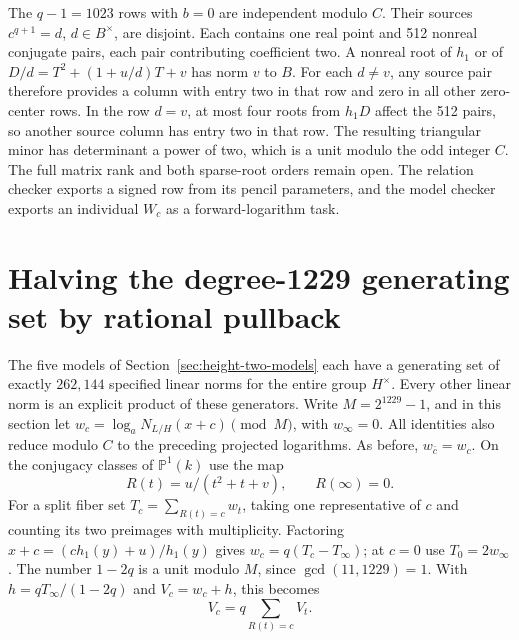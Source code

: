 \documentclass[11pt]{article}
\begin{document}
The \(q-1=1023\) rows with \(b=0\) are independent modulo \(C\).
Their sources \(c^{q+1}=d\), \(d\in B^\times\), are disjoint.
Each contains one real point and 512 nonreal conjugate pairs,
each pair contributing coefficient two. A nonreal root of \(h_1\)
or of \(D/d=T^2+(1+u/d)T+v\) has norm \(v\) to \(B\).
For each \(d\ne v\), any source pair therefore provides a column
with entry two in that row and zero in all other zero-center rows.
In the row \(d=v\), at most four roots from \(h_1D\) affect the
512 pairs, so another source column has entry two in that row.
The resulting triangular minor has determinant a power of two,
which is a unit modulo the odd integer \(C\). The full matrix rank
and both sparse-root orders remain open. The relation checker
exports a signed row from its pencil parameters, and the model
checker exports an individual \(W_c\) as a forward-logarithm task.

\section{Halving the degree-1229 generating set by rational pullback}
\label{sec:linear-pullback}
The five models of Section~\ref{sec:height-two-models} each have a generating
set of exactly \(262{,}144\) specified linear norms for the entire group
\(H^\times\). Every other linear norm is an explicit product of these
generators. Write \(M=2^{1229}-1\), and in this section let
\(w_c=\log_a N_{L/H}(x+c)\pmod M\), with \(w_\infty=0\). All
identities also reduce modulo \(C\) to the preceding projected logarithms.
As before, \(w_{\bar c}=w_c\). On the conjugacy classes of
\(\mathbb P^1(k)\) use the map
\[
            R(t)=u/(t^2+t+v),\qquad R(\infty)=0 .
\]
For a split fiber set \(T_c=\sum_{R(t)=c}w_t\), taking one representative
of \(c\) and counting its two preimages with multiplicity. Factoring
\(x+c=(c h_1(y)+u)/h_1(y)\) gives \(w_c=q(T_c-T_\infty)\);
at \(c=0\) use \(T_0=2w_\infty\). The number \(1-2q\) is a unit
modulo \(M\), since \(\gcd(11,1229)=1\). With
\(h=qT_\infty/(1-2q)\) and \(V_c=w_c+h\), this becomes
\[
                     V_c=q\sum_{R(t)=c}V_t .
\]
\end{document}
